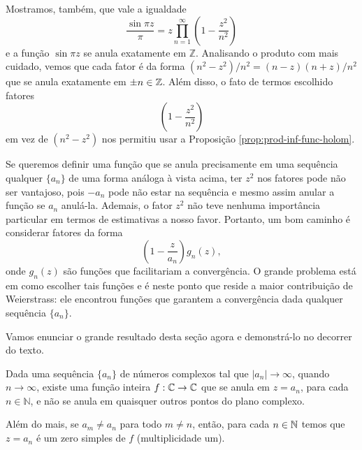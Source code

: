     Mostramos, também, que vale a igualdade 
    $$\frac{\sin{\pi z}}{\pi} = z \prod_{n = 1}^{\infty} \left(1 - \frac{z^2}{n^2}\right)$$
    e a função $\sin{\pi z}$ se anula exatamente em $\mathbb{Z}$. 
    Analisando o produto com mais cuidado, vemos que cada fator é da forma 
    $(n^2 - z^2)/n^2 = (n - z)(n + z)/n^2$ 
    que se anula exatamente em $\pm n \in \mathbb{Z}$. 
    Além disso, o fato de termos escolhido fatores 
    $$\left(1 - \frac{z^2}{n^2}\right)$$
    em vez de $(n^2 - z^2)$ 
    nos permitiu usar a Proposição \ref{prop:prod-inf-func-holom}. 
    
    Se queremos definir uma função que se anula precisamente em uma sequência 
    qualquer $\{a_n\}$ de uma forma análoga à vista acima, ter $z^2$ nos 
    fatores pode não ser vantajoso, pois $-a_n$ pode não estar na sequência e mesmo 
    assim anular a função se $a_n$ anulá-la. Ademais, o fator $z^2$ não teve nenhuma 
    importância particular em termos de estimativas a nosso favor. Portanto, um bom 
    caminho é considerar fatores da forma
    $$ \left(1 - \frac{z}{a_n}\right)g_n(z), $$
    onde $g_n(z)$ são funções que facilitariam a convergência. O grande problema 
    está em como escolher tais funções e é neste ponto que reside a maior 
    contribuição de Weierstrass: ele encontrou funções que garantem a 
    convergência dada qualquer sequência $\{a_n\}$.
    
    Vamos enunciar o grande resultado desta seção agora 
    e demonstrá-lo no decorrer do texto.
    
    \begin{teorema}
    \label{teo-Weierstrass-fatoracao}
        Dada uma sequência $\{a_n\}$ de números complexos tal que 
        $|a_n| \to \infty$, quando $n \to \infty$, 
        existe uma função inteira $f: \mathbb{C} \to \mathbb{C}$ que 
        se anula em $z=a_n$, para cada $n\in\mathbb{N}$, 
        e não se anula em quaisquer outros pontos do plano complexo.
        
        Além do mais, se $a_m\neq a_n$ 
        para todo $m\neq n$, então, para 
        cada $n\in\mathbb{N}$ temos que $z=a_n$ 
        é um zero simples de $f$ (multiplicidade um). 
    \end{teorema}
 
 \bigskip 
    

